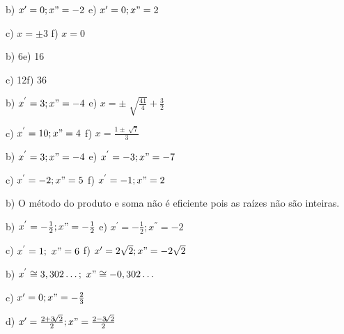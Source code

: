 \begin{respostas}{4}



    \quad b)  \( x'=0;x"=-2 \) \quad \quad \quad \quad e)  \( x'=0;x"=2 \)

    \quad c)  \( x= \pm 3  \) \quad \quad \quad \quad \quad f)  \( x=0 \)


    \quad b) 6\quad \quad \quad \quad \quad e) 16

    \quad c) 12\quad \quad \quad \quad \quad f) 36\quad


    \quad b)  \( x^{'}=3;x"=-4 \) \quad \quad \quad e)  \( x= \pm \sqrt[]{\frac{41}{4}}+\frac{3}{2} \)

    \quad c)  \( x^{'}=10;x"=4 \) \quad \quad \quad f)  \( x=\frac{1 \pm \sqrt[]{7}}{3} \)


    \quad b)  \( x^{'}=3;x"=-4 \) \quad \quad \quad e)  \( x^{'}=-3;x"=-7 \)

    \quad c)  \( x^{'}=-2;x"=5 \) \quad \quad \quad f)  \( x^{'}=-1;x"=2 \)


    b) O método do produto e soma não é eficiente pois as raízes não são inteiras.


    \quad b)  \( x^{'}=-\frac{1}{2};x"=-\frac{1}{2} \) \quad \quad \quad e)  \( x^{'}=-\frac{1}{2};x^{''}=-2 \)

    \quad c)  \( x^{'}=1;~x"=6 \) \quad \quad \quad \quad f)  \( x'=2 \sqrt{2}; x"=-2 \sqrt{2}  \)


    \addtocounter{enumi}{2}

    \quad b)  \( x^{'} \cong 3,302 \ldots ;~x" \cong -0,302 \ldots  \)

    \quad c)  \( x'=0;x"=-\frac{2}{3} \)

    \quad d)  \( x'=\frac{2 + 3 \sqrt[]{2}}{2};x"=\frac{2 - 3 \sqrt[]{2}}{2} \)

\end{respostas}